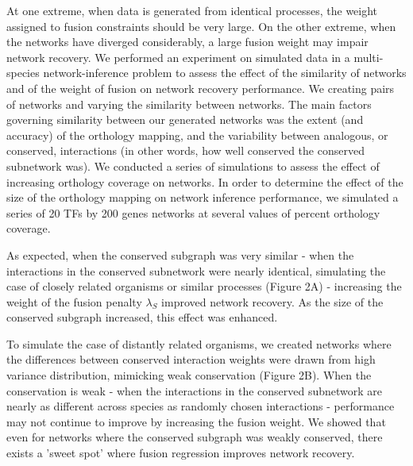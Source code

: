 \documentclass[11pt]{article}
\begin{document}
At one extreme, when data is generated from identical processes, the weight assigned to fusion constraints should be very large. On the other extreme, when the networks have diverged considerably, a large fusion weight may impair network recovery. We performed an experiment on simulated data in a multi-species network-inference problem to assess the effect of the similarity of networks and of the weight of fusion on network recovery performance. We creating pairs of networks and varying the similarity between networks. The main factors governing similarity between our generated networks was the extent (and accuracy) of the orthology mapping, and the variability between analogous, or conserved, interactions (in other words, how well conserved the conserved subnetwork was). We conducted a series of simulations to assess the effect of increasing orthology coverage on networks. In order to determine the effect of the size of the orthology mapping on network inference performance, we simulated a series of 20 TFs by 200 genes networks at several values of percent orthology coverage. 

As expected, when the conserved subgraph was very similar - when the interactions in the conserved subnetwork were nearly identical, simulating the case of closely related organisms or similar processes (Figure 2A) - increasing the weight of the fusion penalty $\lambda_S$ improved network recovery. As the size of the conserved subgraph increased, this effect was enhanced.

To simulate the case of distantly related organisms, we created networks where the differences between conserved interaction weights were drawn from high variance distribution, mimicking weak conservation (Figure 2B). When the conservation is weak - when the interactions in the conserved subnetwork are nearly as different across species as randomly chosen interactions - performance may not continue to improve by increasing the fusion weight. We showed that even for networks where the conserved subgraph was weakly conserved, there exists a 'sweet spot' where fusion regression improves network recovery. 
\end{document}
